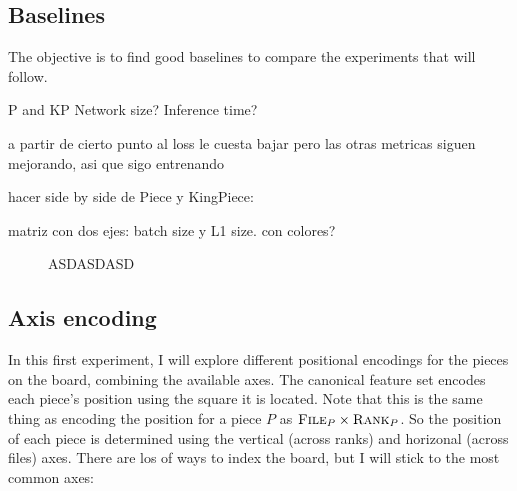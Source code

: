 \subsection{Baselines}

The objective is to find good baselines to compare the experiments that will follow.

P and KP
Network size?
Inference time?

a partir de cierto punto al loss le cuesta bajar pero las otras metricas siguen mejorando, asi que sigo entrenando

hacer side by side de Piece y KingPiece:

matriz con dos ejes: batch size y L1 size. con colores?

\begin{figure}[H]
\centering
{}
\caption{ASDASDASD}
\label{fig:asdasdasd}
\end{figure}


\newpage
\subsection{Axis encoding} %

\newcommand{\axisarrows}[1]{\parbox{0.7cm}{\texttt{[image: ../assets/arrows/\#1.pdf]}}}

In this first experiment, I will explore different positional encodings for the pieces on the board, combining the available axes. The canonical  feature set encodes each piece's position using the square it is located. Note that this is the same thing as encoding the position for a piece $P$ as $\textsc{File}_{P} \times \textsc{Rank}_{P}$. So the position of each piece is determined using the vertical (across ranks) and horizonal (across files) axes. There are los of ways to index the board, but I will stick to the most common axes:

